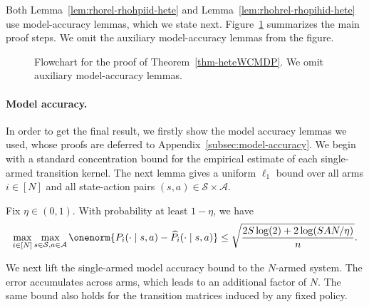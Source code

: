\documentclass[mnsc,nonblindrev]{informs3}
\newcommand{\piid}{\pi_{\mathrm{ID}}}
\newcommand{\pihid}{\widehat{\pi}_{\mathrm{ID}}}
\newcommand{\States}{\mathcal{S}}
\newcommand{\Actions}{\mathcal{A}}
\begin{document}
Both Lemma~\ref{lem:rhorel-rhohpiid-hete} and Lemma~\ref{lem:rhohrel-rhopihid-hete} use model-accuracy lemmas, which we state
next. Figure~\ref{fig:flow-pf-thmhete} summarizes
the main proof steps. We omit the auxiliary model-accuracy lemmas from the
figure.
\begin{figure}[htbp]
\centering
{}
\caption{Flowchart for the proof of Theorem~\ref{thm-heteWCMDP}. We omit auxiliary model-accuracy lemmas.}
\label{fig:flow-pf-thmhete}
\end{figure}

\paragraph{Model accuracy.} In order to get the final result, we firstly show the model accuracy lemmas we used, whose proofs are deferred to Appendix~\ref{subsec:model-accuracy}. We begin with a standard concentration bound for the empirical estimate of each single-armed transition kernel.
The next lemma gives a uniform $\ell_1$ bound over all arms $i\in[N]$ and all state-action pairs $(s,a)\in\States\times\Actions$.
\begin{lemma}\label{samplesize-singlearm_accu}
    Fix $\eta \in (0,1)$. With probability at least $1 - \eta$, we have
    \begin{align*}
        \max_{i\in[N]}\max_{s \in \mathcal{S}, a \in \mathcal{A}} \onenorm{P_i(\cdot\mid s,a) - \widehat{P}_i(\cdot\mid s,a)} \leq \sqrt{\frac{2S \log(2) + 2\log (SAN/\eta)}{n}}.
    \end{align*}
\end{lemma}
We next lift the single-armed model accuracy bound to the \(N\)-armed
system. The error accumulates across arms, which leads to an additional
factor of \(N\). The same bound also holds for the transition matrices
induced by any fixed policy.
\end{document}
